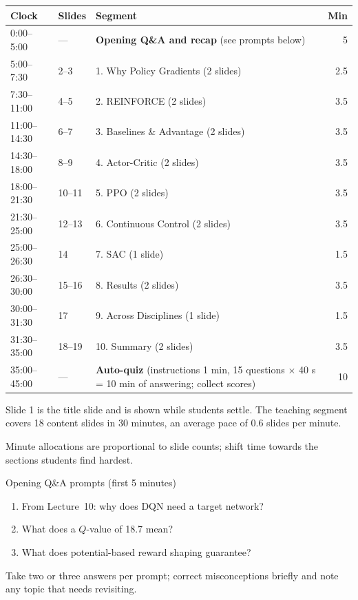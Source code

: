 \documentclass[11pt]{article}
\begin{document}
\begin{center}\small\renewcommand{\arraystretch}{1.2}\begin{tabularx}{\textwidth}{@{}l l X r@{}}\toprule\textbf{Clock} & \textbf{Slides} & \textbf{Segment} & \textbf{Min}\\\midrule

0:00--5:00 & --- & \textbf{Opening Q\&A and recap} (see prompts below) & 5\\

5:00--7:30 & 2--3 & 1. Why Policy Gradients (2 slides) & 2.5\\

7:30--11:00 & 4--5 & 2. REINFORCE (2 slides) & 3.5\\

11:00--14:30 & 6--7 & 3. Baselines \& Advantage (2 slides) & 3.5\\

14:30--18:00 & 8--9 & 4. Actor-Critic (2 slides) & 3.5\\

18:00--21:30 & 10--11 & 5. PPO (2 slides) & 3.5\\

21:30--25:00 & 12--13 & 6. Continuous Control (2 slides) & 3.5\\

25:00--26:30 & 14 & 7. SAC (1 slide) & 1.5\\

26:30--30:00 & 15--16 & 8. Results (2 slides) & 3.5\\

30:00--31:30 & 17 & 9. Across Disciplines (1 slide) & 1.5\\

31:30--35:00 & 18--19 & 10. Summary (2 slides) & 3.5\\

35:00--45:00 & --- & \textbf{Auto-quiz} (instructions 1 min, 15 questions $\times$ 40 s = 10 min of answering; collect scores) & 10\\\bottomrule\end{tabularx}\end{center}

Slide 1 is the title slide and is shown while students settle. The teaching segment covers 18 content slides in 30 minutes, an average pace of 0.6 slides per minute. 

Minute allocations are proportional to slide counts; shift time towards the sections students find hardest.

\begin{instr}{Opening Q\&A prompts (first 5 minutes)}\begin{enumerate}\item From Lecture~10: why does DQN need a target network?\item What does a $Q$-value of 18.7 mean?\item What does potential-based reward shaping guarantee?\end{enumerate}Take two or three answers per prompt; correct misconceptions briefly and note any topic that needs revisiting.\end{instr}
\end{document}
